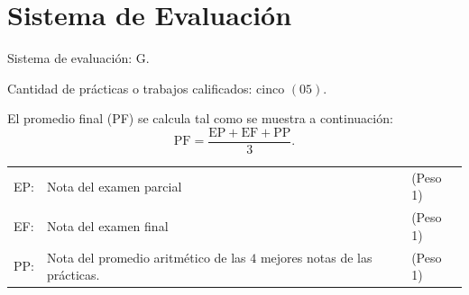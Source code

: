 \section{Sistema de Evaluación}

\noindent

Sistema de evaluación: G.

Cantidad de prácticas o trabajos calificados: cinco $\left(05\right)$.

El promedio final (PF) se calcula tal como se muestra a
continuación:
\begin{equation*}
	\text{PF}=
	\frac{\text{EP}+\text{EF}+\text{PP}}{3}.
\end{equation*}
\begin{table}[ht!]
	\begin{tabular}{lll}
		EP: & Nota del examen parcial                                                 & (Peso 1) \\
		EF: & Nota del examen final                                                   & (Peso 1) \\
		PP: & Nota del promedio aritmético de las $4$ mejores notas de las prácticas. & (Peso 1)
	\end{tabular}
\end{table}






